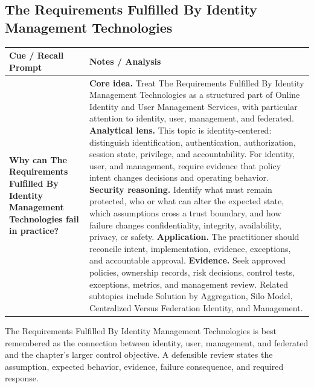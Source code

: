 \documentclass[11pt]{article}
\newcommand{\CornellHeader}{%
\rowcolor{Navy}\color{white}\bfseries Cue / Recall Prompt & \color{white}\bfseries Notes / Analysis\\\hline}
\newcommand{\CornellRow}[2]{%
\cellcolor{CueGray}\RaggedRight\textbf{#1} & \RaggedRight #2\\\hline}
\begin{document}
\subsection*{The Requirements Fulfilled By Identity Management Technologies}
\begin{longtable}{>{\RaggedRight\arraybackslash}p{}|>{\RaggedRight\arraybackslash}p{}}
\CornellHeader
\CornellRow{Why can The Requirements Fulfilled By Identity Management Technologies fail in practice?}{\textbf{Core idea.} Treat The Requirements Fulfilled By Identity Management Technologies as a structured part of Online Identity and User Management Services, with particular attention to identity, user, management, and federated. \textbf{Analytical lens.} This topic is identity-centered: distinguish identification, authentication, authorization, session state, privilege, and accountability. For identity, user, and management, require evidence that policy intent changes decisions and operating behavior. \textbf{Security reasoning.} Identify what must remain protected, who or what can alter the expected state, which assumptions cross a trust boundary, and how failure changes confidentiality, integrity, availability, privacy, or safety. \textbf{Application.} The practitioner should reconcile intent, implementation, evidence, exceptions, and accountable approval. \textbf{Evidence.} Seek approved policies, ownership records, risk decisions, control tests, exceptions, metrics, and management review. Related subtopics include Solution by Aggregation, Silo Model, Centralized Versus Federation Identity, and Management.}
\end{longtable}
\begin{topicsummary}
The Requirements Fulfilled By Identity Management Technologies is best remembered as the connection between identity, user, management, and federated and the chapter's larger control objective. A defensible review states the assumption, expected behavior, evidence, failure consequence, and required response.
\end{topicsummary}
\end{document}
